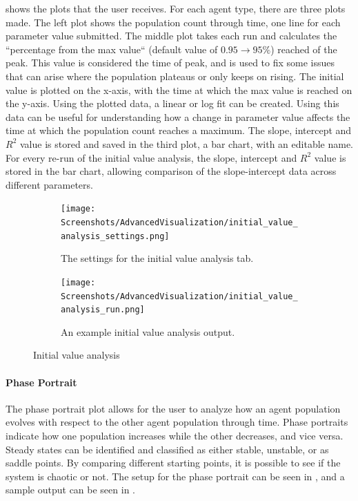 shows the plots that the user receives.
For each agent type, there are three plots made.
The left plot shows the population count through time, one line for each parameter value submitted.
The middle plot takes each run and calculates the “percentage from the max value“ (default value of $0.95 \rightarrow 95\%$) reached of the peak.
This value is considered the time of peak, and is used to fix some issues that can arise where the population plateaus or only keeps on rising.
The initial value is plotted on the x-axis, with the time at which the max value is reached on the y-axis.
Using the plotted data, a linear or log fit can be created.
Using this data can be useful for understanding how a change in parameter value affects the time at which the population count reaches a maximum.
The slope, intercept and $R^2$ value is stored and saved in the third plot, a bar chart, with an editable name.
For every re-run of the initial value analysis, the slope, intercept and $R^2$ value is stored in the bar chart, allowing comparison of the slope-intercept data across different parameters. 

\begin{figure}[!ht]
    \centering
    \begin{subfigure}{0.49\linewidth}
        \centering
        \captionsetup{width=1\linewidth}
        \texttt{[image: Screenshots/AdvancedVisualization/initial\_value\_analysis\_settings.png]}
        \caption{
            The settings for the initial value analysis tab. 
        }
        \label{fig:ss:av:initial_value_analysis_settings}
        \vspace*{\fill}
    \end{subfigure}
    \hfill
    \begin{subfigure}{0.49\linewidth}
        \centering
        \captionsetup{width=1\linewidth}
        \texttt{[image: Screenshots/AdvancedVisualization/initial\_value\_analysis\_run.png]}
        \caption{
            An example initial value analysis output. 
        }
        \label{fig:ss:av:initial_value_analysis_run}
        \vspace*{\fill}
    \end{subfigure}
    \caption{Initial value analysis}
\end{figure}

\paragraph{Phase Portrait}
\label{sec:phase_portrait}
The phase portrait plot allows for the user to analyze how an agent population evolves with respect to the other agent population through time.
Phase portraits indicate how one population increases while the other decreases, and vice versa.
Steady states can be identified and classified as either stable, unstable, or as saddle points.
By comparing different starting points, it is possible to see if the system is chaotic or not.
The setup for the phase portrait can be seen in , and a sample output can be seen in . 

